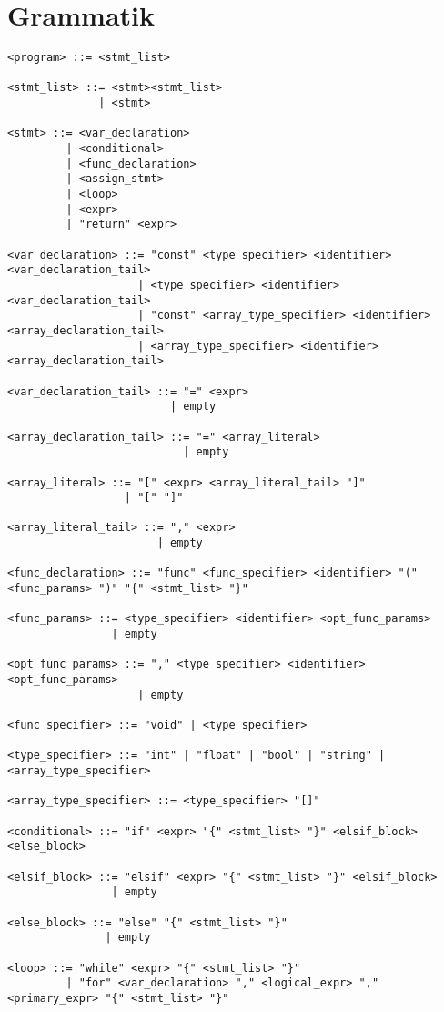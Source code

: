 \documentclass{TDP003mall}
\begin{document}
    \section{Grammatik}
\begin{verbatim}
<program> ::= <stmt_list>

<stmt_list> ::= <stmt><stmt_list>
              | <stmt>

<stmt> ::= <var_declaration> 
         | <conditional>
         | <func_declaration>
         | <assign_stmt>
         | <loop>
         | <expr>
         | "return" <expr>

<var_declaration> ::= "const" <type_specifier> <identifier> <var_declaration_tail>
                    | <type_specifier> <identifier> <var_declaration_tail>
                    | "const" <array_type_specifier> <identifier> <array_declaration_tail>
                    | <array_type_specifier> <identifier> <array_declaration_tail>

<var_declaration_tail> ::= "=" <expr>
                         | empty

<array_declaration_tail> ::= "=" <array_literal>
                           | empty

<array_literal> ::= "[" <expr> <array_literal_tail> "]"
                  | "[" "]"

<array_literal_tail> ::= "," <expr>
                       | empty

<func_declaration> ::= "func" <func_specifier> <identifier> "(" <func_params> ")" "{" <stmt_list> "}"

<func_params> ::= <type_specifier> <identifier> <opt_func_params>
                | empty

<opt_func_params> ::= "," <type_specifier> <identifier> <opt_func_params>
                    | empty

<func_specifier> ::= "void" | <type_specifier>

<type_specifier> ::= "int" | "float" | "bool" | "string" | <array_type_specifier>

<array_type_specifier> ::= <type_specifier> "[]"

<conditional> ::= "if" <expr> "{" <stmt_list> "}" <elsif_block> <else_block>

<elsif_block> ::= "elsif" <expr> "{" <stmt_list> "}" <elsif_block>
                | empty

<else_block> ::= "else" "{" <stmt_list> "}"
               | empty

<loop> ::= "while" <expr> "{" <stmt_list> "}"
         | "for" <var_declaration> "," <logical_expr> "," <primary_expr> "{" <stmt_list> "}"


\end{verbatim}
\end{document}
